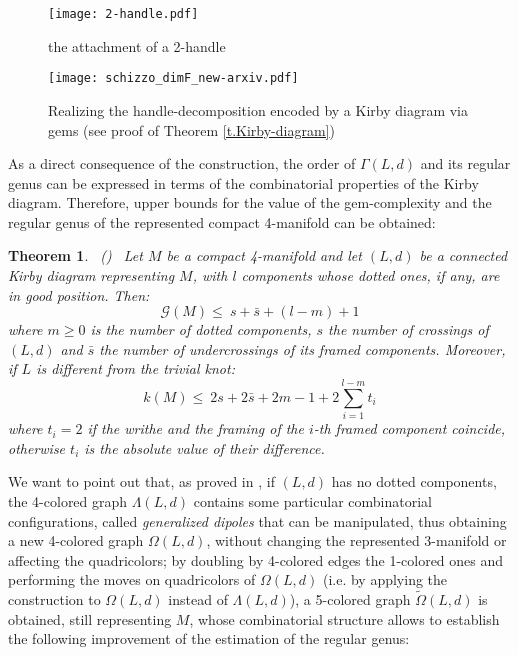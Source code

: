 \documentclass[12pt,a4paper]{article}
\newtheorem{theorem}[lemma]{Theorem}
\newcommand{\G}{\Gamma}
\begin{document}
\begin{figure} [h!]
    \centering
    \texttt{[image: 2-handle.pdf]}
\caption{the attachment of a 2-handle}
    \label{fig:2-handle}
\end{figure}


\begin{figure}  [h!]
    \centering
    \texttt{[image: schizzo\_dimF\_new-arxiv.pdf]}
    \caption{Realizing the handle-decomposition encoded by a Kirby diagram via gems (see proof of Theorem \ref{t.Kirby-diagram})}
    \label{fig:schizzo-dim}
\end{figure}

As a direct consequence of the construction, the order of $\G(L,d)$ and its regular genus can be expressed in terms of the combinatorial properties of the Kirby diagram. Therefore, upper bounds for the value of the gem-complexity and the regular genus of the represented compact 4-manifold can be obtained:

\begin{theorem} \ {\rm (\cite{Casali-Cristofori Kirby-diagrams})} \  \label{regular-genus&gem-complexity(dotted)} 
Let $M$ be a compact 4-manifold and let $(L,d)$ be a connected Kirby diagram representing $M$, with $l$ components %
 whose dotted ones, if any, are in good position. Then:
$$\mathcal G(M)\leq  \  s + \bar s  + (l-m) +1$$ 
\noindent where $m \ge 0$ is the number of dotted components, $s$ the number of crossings of $(L,d)$ and $\bar s$ the number of undercrossings of its framed components.
Moreover, if $L$ is different from the trivial knot: 
$$k(M)\leq \ 2s + 2 \bar s  + 2 m -1 + 2\sum_{i=1}^{l-m} t_i  $$
\noindent where 
$t_i=2$ if the writhe and the framing of the $i$-th framed component coincide, otherwise $t_i$ is the absolute value of their difference.
\end{theorem} 

We want to point out that, as proved in \cite{Casali JKTR2000}, if $(L,d)$ has no dotted components, the 4-colored graph $\Lambda(L,d)$ contains some particular combinatorial configurations, called {\it generalized dipoles} that can be manipulated, thus obtaining a new 4-colored graph $\Omega(L,d)$, without changing the represented 3-manifold or affecting the quadricolors; by doubling by 4-colored edges the 1-colored ones and performing the moves on quadricolors of $\Omega(L,d)$ (i.e.  by applying the construction to $\Omega(L,d)$ instead of $\Lambda(L,d)$), a 5-colored graph $\tilde\Omega(L,d)$ is obtained, still representing $M$, whose combinatorial structure allows to establish the following improvement of the estimation of the regular genus:
\end{document}
